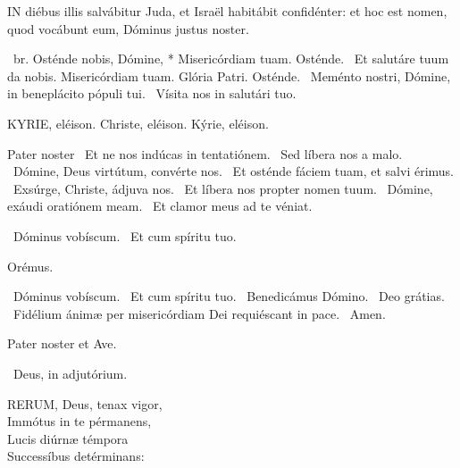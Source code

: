
\lettrine[lines=2]{I}{N} diébus illis salvábitur Juda, et Israël habitábit confidénter: et hoc est nomen, quod vocábunt eum, Dóminus justus noster.


\R\ br. Osténde nobis, Dómine, * Misericórdiam tuam. Osténde. \V\ Et salutáre tuum da nobis. Misericórdiam tuam. Glória Patri. Osténde. \V\ Meménto nostri, Dómine, in beneplácito pópuli tui. \R\ Vísita nos in salutári tuo.



KYRIE, eléison. Christe, eléison. Kýrie, eléison.

Pater noster  \V\ Et ne nos indúcas in tentatiónem. \R\ Sed líbera nos a malo. \V\ Dómine, Deus virtútum, convérte nos. \R\ Et osténde fáciem tuam, et salvi érimus. \V\ Exsúrge, Christe, ádjuva nos. \R\ Et líbera nos propter nomen tuum. \V\ Dómine, exáudi oratiónem meam. \R\ Et clamor meus ad te véniat.


\V\ Dóminus vobíscum. \R\ Et cum spíritu tuo.

Orémus.


\V\ Dóminus vobíscum. \R\ Et cum spíritu tuo. \V\ Benedicámus Dómino. \R\ Deo grátias. \V\ Fidélium ánimæ per misericórdiam Dei requiéscant in pace. \R\ Amen.


\sectionornament


Pater noster et Ave.

\V\ Deus, in adjutórium.


\lettrine[lines=2]{R}{ERUM}, Deus, tenax vigor,\\
Immótus in te pérmanens,\\
Lucis diúrnæ témpora\\
Successíbus detérminans:

